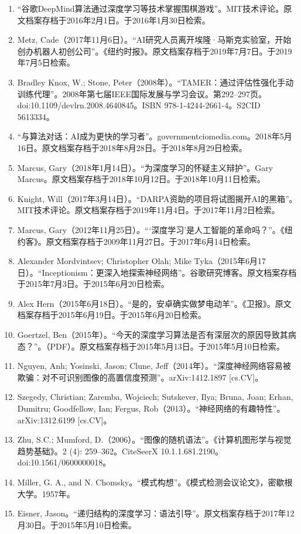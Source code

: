 \begin{enumerate}
\item “谷歌DeepMind算法通过深度学习等技术掌握围棋游戏”。MIT技术评论。原文档案存档于2016年2月1日。于2016年1月30日检索。
\item Metz, Cade（2017年11月6日）。“AI研究人员离开埃隆·马斯克实验室，开始创办机器人初创公司”。《纽约时报》。原文档案存档于2019年7月7日。于2019年7月5日检索。
\item Bradley Knox, W.; Stone, Peter（2008年）。“TAMER：通过评估性强化手动训练代理”。2008年第七届IEEE国际发展与学习会议。第292–297页。doi:10.1109/devlrn.2008.4640845。ISBN 978-1-4244-2661-4。S2CID 5613334。
\item “与算法对话：AI成为更快的学习者”。governmentciomedia.com。2018年5月16日。原文档案存档于2018年8月28日。于2018年8月29日检索。
\item Marcus, Gary（2018年1月14日）。“为深度学习的怀疑主义辩护”。Gary Marcus。原文档案存档于2018年10月12日。于2018年10月11日检索。
\item Knight, Will（2017年3月14日）。“DARPA资助的项目将试图揭开AI的黑箱”。MIT技术评论。原文档案存档于2019年11月4日。于2017年11月2日检索。
\item Marcus, Gary（2012年11月25日）。“‘深度学习’是人工智能的革命吗？”。《纽约客》。原文档案存档于2009年11月27日。于2017年6月14日检索。
\item Alexander Mordvintsev; Christopher Olah; Mike Tyka（2015年6月17日）。“Inceptionism：更深入地探索神经网络”。谷歌研究博客。原文档案存档于2015年7月3日。于2015年6月20日检索。
\item Alex Hern（2015年6月18日）。“是的，安卓确实做梦电动羊”。《卫报》。原文档案存档于2015年6月19日。于2015年6月20日检索。
\item Goertzel, Ben（2015年）。“今天的深度学习算法是否有深层次的原因导致其病态？”。（PDF）。原文档案存档于2015年5月13日。于2015年5月10日检索。
\item Nguyen, Anh; Yosinski, Jason; Clune, Jeff（2014年）。“深度神经网络容易被欺骗：对不可识别图像的高置信度预测”。arXiv:1412.1897 [cs.CV]。
\item Szegedy, Christian; Zaremba, Wojciech; Sutskever, Ilya; Bruna, Joan; Erhan, Dumitru; Goodfellow, Ian; Fergus, Rob（2013）。“神经网络的有趣特性”。arXiv:1312.6199 [cs.CV]。
\item Zhu, S.C.; Mumford, D.（2006）。“图像的随机语法”。《计算机图形学与视觉趋势基础》。2 (4): 259–362。CiteSeerX 10.1.1.681.2190。doi:10.1561/0600000018。
\item Miller, G. A., and N. Chomsky。“模式构想”。《模式检测会议论文》，密歇根大学。1957年。
\item Eisner, Jason。“递归结构的深度学习：语法引导”。原文档案存档于2017年12月30日。于2015年5月10日检索。

\end{enumerate}
